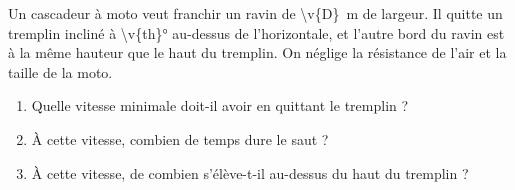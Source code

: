 Un cascadeur à moto veut franchir un ravin de \qty{\v{D}}{m} de largeur. Il quitte un tremplin incliné à \ang{\v{th}} au-dessus de l'horizontale, et l'autre bord du ravin est à la même hauteur que le haut du tremplin. On néglige la résistance de l'air et la taille de la moto.

\begin{center}
\end{center}

\begin{enumerate}[label=\alph*)]
    \item Quelle vitesse minimale doit-il avoir en quittant le tremplin ?
    \item À cette vitesse, combien de temps dure le saut ?
    \item À cette vitesse, de combien s'élève-t-il au-dessus du haut du tremplin ?
\end{enumerate}
